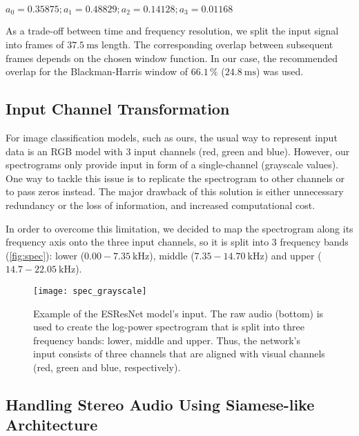 \documentclass[a4paper,conference]{IEEEtran}
\begin{document}
\begin{center}
    $a_0=0.35875;a_1=0.48829;a_2=0.14128;a_3=0.01168$
\end{center}

As a trade-off between time and frequency resolution, we split the input signal into frames of $37.5\:\si{\milli\second}$ length.
The corresponding overlap between subsequent frames depends on the chosen window function.
In our case, the recommended overlap for the \mbox{Blackman-Harris} window of $66.1\,\%$ ($24.8\:\si{\milli\second}$) \cite{heinzel2002spectrum} was used.

\subsection{Input Channel Transformation} \label{ssec:align}

For image classification models, such as ours, the usual way to represent input data is an RGB model with 3 input channels (red, green and blue).
However, our spectrograms only provide input in form of a single-channel (grayscale values).
One way to tackle this issue is to replicate the spectrogram to other channels or to pass zeros instead.
The major drawback of this solution is either unnecessary redundancy or the loss of information, and increased computational cost.

In order to overcome this limitation, we decided to map the spectrogram along its frequency axis onto the three input channels, so it is split into 3 frequency bands (\autoref{fig:spec}): lower ($0.00-7.35\:\si{\kilo\hertz}$), middle ($7.35-14.70\:\si{\kilo\hertz}$) and upper ($14.7-22.05\:\si{\kilo\hertz}$).

\begin{figure}[hbt]
\centering
\texttt{[image: spec\_grayscale]}
\caption{Example of the ESResNet model's input. The raw audio (bottom) is used to create the log-power spectrogram that is split into three frequency bands: lower, middle and upper. Thus, the network's input consists of three channels that are aligned with visual channels (red, green and blue, respectively).}
\label{fig:spec}
\end{figure}

\subsection{Handling Stereo Audio Using Siamese-like Architecture} \label{ssec:siamese}
\end{document}
